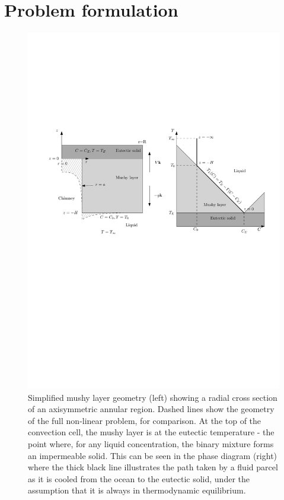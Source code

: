 \documentclass[11pt,twocolumn]{article}
\begin{document}
\section{Problem formulation}
\label{sec:problem-formulation}

\begin{figure}[t]
       \centering
        \includegraphics[width=\textwidth]{simplified-arrangement}
        \setlength{\belowcaptionskip}{0pt} %
        
       \caption{Simplified mushy layer geometry (left) showing a radial cross section of an axisymmetric annular region. Dashed lines show the geometry of the full non-linear problem, for comparison. At the top of the convection cell, the mushy layer is at the eutectic temperature - the point where, for any liquid concentration, the binary mixture forms an impermeable solid. This can be seen in the phase diagram (right) where the thick black line illustrates the path taken by a fluid parcel as it is cooled from the ocean to the eutectic solid, under the assumption that it is always in thermodynamic equilibrium.}
    \label{fig:arrangement}
\end{figure}
\end{document}
